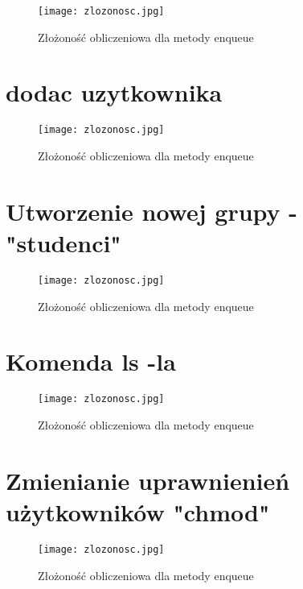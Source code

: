 \documentclass{article}
\begin{document}
\begin{figure}[H]
    \centering
    \hspace*{-1cm}
    \texttt{[image: zlozonosc.jpg]}
    \caption{Złożoność obliczeniowa dla metody enqueue}
    \label{2}
\end{figure}


\section{dodac uzytkownika}

\begin{figure}[H]
    \centering
    \hspace*{-1cm}
    \texttt{[image: zlozonosc.jpg]}
    \caption{Złożoność obliczeniowa dla metody enqueue}
    \label{2}
\end{figure}


\section{Utworzenie nowej grupy - "studenci"}

\begin{figure}[H]
    \centering
    \hspace*{-1cm}
    \texttt{[image: zlozonosc.jpg]}
    \caption{Złożoność obliczeniowa dla metody enqueue}
    \label{2}
\end{figure}


\section{Komenda ls -la}

\begin{figure}[H]
    \centering
    \hspace*{-1cm}
    \texttt{[image: zlozonosc.jpg]}
    \caption{Złożoność obliczeniowa dla metody enqueue}
    \label{2}
\end{figure}


\section{Zmienianie uprawnienień użytkowników "chmod" }

\begin{figure}[H]
    \centering
    \hspace*{-1cm}
    \texttt{[image: zlozonosc.jpg]}
    \caption{Złożoność obliczeniowa dla metody enqueue}
    \label{2}
\end{figure}
\end{document}
